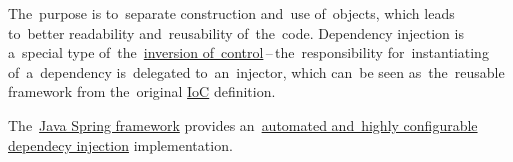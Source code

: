 The~purpose is to~separate construction and~use of~objects, which leads to~better readability and~reusability of~the~code. Dependency injection is a~special type of~the~\hyperref[inversionofcontrol]{inversion of~control}\,--\,the~responsibility for~instantiating of~a~dependency is~delegated to~an~injector, which can~be seen as~the~reusable framework from the~original \hyperref[inversionofcontrol]{IoC} definition.

The~\hyperref[springframework]{Java Spring framework} provides an~\hyperref[springdependencyinjection]{automated and~highly configurable dependecy injection} implementation.
